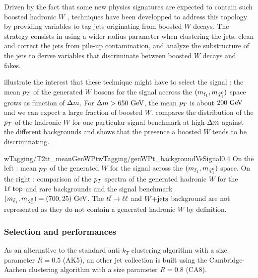              Driven by the fact that some new physics signatures are expected to contain
             such boosted hadronic $W$ , techniques have been developped to
             address this topology by providing variables to tag jets originating from
             boosted $W$ decays. The strategy consists in using a wider radius parameter
             when clustering the jets, clean and correct the jets from pile-up contamination,
             and analyze the substructure of the jets to derive variables that discriminate
             between boosted $W$ decays and fakes.

              illustrate the interest that these technique might have to
             select the signal : the mean $p_T$ of the generated
             $W$ bosons for the signal accross the $(m_{\tilde{t}_1}, m_{\tilde{\chi}_1^0})$
             space grows as function of $\Delta m$. For $\Delta m > 650~\text{GeV}$, the
             mean $p_T$ is about $200~\text{GeV}$ and we can expect a large fraction of boosted $W$.
              compares the distribution of the $p_T$ of the hadronic $W$ for one
             particular signal benchmark at high-$\Delta m$ against the different backgrounds
             and shows that the presence a boosted $W$ tends to be discriminating.

                              {wTagging/T2tt_meanGenWPt}{wTagging/genWPt_backgroundVsSignal}{0.4}
                              {On the left : mean $p_T$ of the generated $W$ for the
                              signal across the $(m_{\tilde{t}_1}, m_{\tilde{\chi}_1^0})$ space.
                              On the right : comparison of the $p_T$ spectra of the generated
                              hadronic $W$ for the $1\ell~\text{top}$ and rare backgrounds and
                              the signal benchmark $(m_{\tilde{t}_1}, m_{\tilde{\chi}_1^0}) = (700,25) ~\text{GeV}$.
                              The $t\bar{t} \rightarrow \ell \ell$ and $\text{$W$+jets}$ background are not represented
                              as they do not contain a generated hadronic $W$ by definition.}

            \subsubsection{Selection and performances}

            As an alternative to the standard anti-$k_T$ clustering algorithm with a
            size parameter $R = 0.5$ (AK5), an other jet collection is built using the
            Cambridge-Aachen clustering algorithm with a size parameter $R = 0.8$ (CA8).

